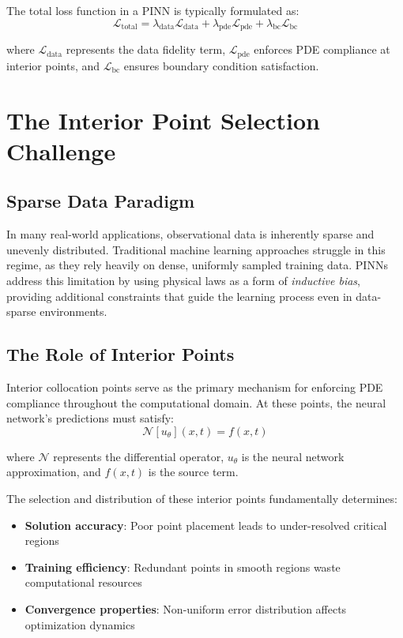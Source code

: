 \documentclass[11pt,a4paper]{article}
\begin{document}
The total loss function in a PINN is typically formulated as:
\begin{equation}
\mathcal{L}_{\text{total}} = \lambda_{\text{data}} \mathcal{L}_{\text{data}} + \lambda_{\text{pde}} \mathcal{L}_{\text{pde}} + \lambda_{\text{bc}} \mathcal{L}_{\text{bc}}
\end{equation}

where $\mathcal{L}_{\text{data}}$ represents the data fidelity term, $\mathcal{L}_{\text{pde}}$ enforces PDE compliance at interior points, and $\mathcal{L}_{\text{bc}}$ ensures boundary condition satisfaction.

\section{The Interior Point Selection Challenge}

\subsection{Sparse Data Paradigm}

In many real-world applications, observational data is inherently sparse and unevenly distributed. Traditional machine learning approaches struggle in this regime, as they rely heavily on dense, uniformly sampled training data. PINNs address this limitation by using physical laws as a form of \textit{inductive bias}, providing additional constraints that guide the learning process even in data-sparse environments.

\subsection{The Role of Interior Points}

Interior collocation points serve as the primary mechanism for enforcing PDE compliance throughout the computational domain. At these points, the neural network's predictions must satisfy:
\begin{equation}
\mathcal{N}[u_\theta](x, t) = f(x, t)
\end{equation}

where $\mathcal{N}$ represents the differential operator, $u_\theta$ is the neural network approximation, and $f(x,t)$ is the source term.

The selection and distribution of these interior points fundamentally determines:
\begin{itemize}
    \item \textbf{Solution accuracy}: Poor point placement leads to under-resolved critical regions
    \item \textbf{Training efficiency}: Redundant points in smooth regions waste computational resources
    \item \textbf{Convergence properties}: Non-uniform error distribution affects optimization dynamics
\end{itemize}
\end{document}
